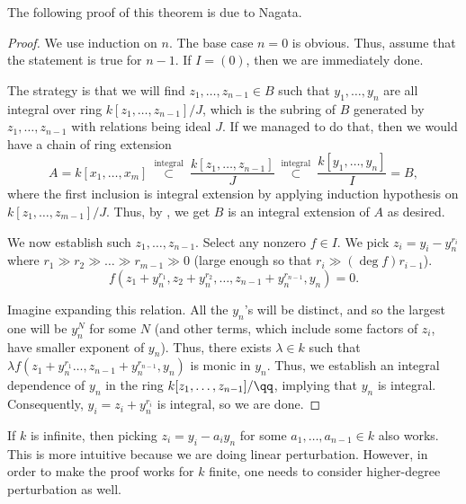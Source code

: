 The following proof of this theorem is due to Nagata.
\begin{proof}
    We use induction on $n$. The base case $n=0$
    is obvious. 
    Thus, assume that the statement is true for $n-1$.
    If $I = (0)$, then we are immediately done.

    The strategy is that we will find $z_1,\dots,z_{n-1}\in B$
    such that $y_1,\dots,y_n$ are all integral over ring
    $k[z_1,\dots,z_{n-1}]/J$, which is the subring of $B$ generated by $z_1,\dots,z_{n-1}$ with relations being ideal $J$.
    If we managed to do that, then we would have a chain of ring extension
    $$A=k[x_1,\dots,x_m]\  \stackrel{\text{integral}}\subset\  
    \frac{k[z_1,\dots,z_{n-1}]}J
    \ \stackrel{\text{integral}}\subset\ \frac{k[y_1,\dots,y_n]}I=B,$$
    where the first inclusion is integral extension by 
    applying induction hypothesis on $k[z_1,\dots,z_{m-1}]/J$.
    Thus, by ,
    we get $B$ is an integral extension of $A$ as desired.

    We now establish such $z_1,\dots,z_{n-1}$.
    Select any nonzero $f\in I$.
    We pick $z_i = y_i - y_n^{r_i}$ where
    $r_1 \gg r_2 \gg \dots \gg r_{m-1} \gg 0$
    (large enough so that $r_i \gg (\deg f) r_{i-1}$).
    $$f(z_1 + y_n^{r_1}, z_2+y_n^{r_2}, 
    \dots, z_{n-1}+y_n^{r_{n-1}}, y_n) = 0.$$

    Imagine expanding this relation.
    All the $y_n$'s will be distinct, and so the largest one
    will be $y_n^N$ for some $N$
    (and other terms, which include some factors of $z_i$,
    have smaller exponent of $y_n$).
    Thus, there exists $\lambda\in k$ such that 
    $\lambda f(z_1 + y_n^{r_1}
    \dots, z_{n-1}+y_n^{r_{n-1}}, y_n)$ is monic in $y_n$.
    Thus, we establish an integral dependence of $y_n$
    in the ring $k[z_1,\dots,z_{n-1}]/\qq$,
    implying that $y_n$ is integral.
    Consequently, $y_i = z_i + y_n^{r_i}$ is integral,
    so we are done.
\end{proof}
\begin{remark}
    If $k$ is infinite, then picking $z_i = y_i-a_iy_n$
    for some $a_1,\dots,a_{n-1}\in k$ also works.
    This is more intuitive because we are doing linear perturbation.
    However, in order to make the proof works for $k$ finite,
    one needs to consider higher-degree perturbation as well.
\end{remark}

